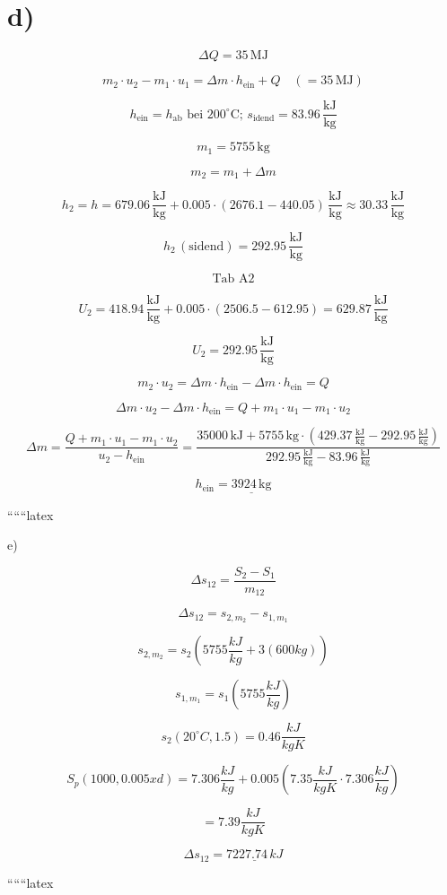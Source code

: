 \section*{d)}

\[
\Delta Q = 35 \, \text{MJ}
\]

\[
m_2 \cdot u_2 - m_1 \cdot u_1 = \Delta m \cdot h_{\text{ein}} + Q \quad \left( = 35 \, \text{MJ} \right)
\]

\[
h_{\text{ein}} = h_{\text{ab}} \text{ bei } 200^\circ \text{C}; \, s_{\text{idend}} = 83.96 \, \frac{\text{kJ}}{\text{kg}}
\]

\[
m_1 = 5755 \, \text{kg}
\]

\[
m_2 = m_1 + \Delta m
\]

\[
h_2 = h = 679.06 \, \frac{\text{kJ}}{\text{kg}} + 0.005 \cdot (2676.1 - 440.05) \, \frac{\text{kJ}}{\text{kg}} \approx 30.33 \, \frac{\text{kJ}}{\text{kg}}
\]

\[
h_2 \, (\text{sidend}) = 292.95 \, \frac{\text{kJ}}{\text{kg}}
\]

\[
\text{Tab A2}
\]

\[
U_2 = 418.94 \, \frac{\text{kJ}}{\text{kg}} + 0.005 \cdot (2506.5 - 612.95) = 629.87 \, \frac{\text{kJ}}{\text{kg}}
\]

\[
U_2 = 292.95 \, \frac{\text{kJ}}{\text{kg}}
\]

\[
m_2 \cdot u_2 = \Delta m \cdot h_{\text{ein}} - \Delta m \cdot h_{\text{ein}} = Q
\]

\[
\Delta m \cdot u_2 - \Delta m \cdot h_{\text{ein}} = Q + m_1 \cdot u_1 - m_1 \cdot u_2
\]

\[
\Delta m = \frac{Q + m_1 \cdot u_1 - m_1 \cdot u_2}{u_2 - h_{\text{ein}}} = \frac{35000 \, \text{kJ} + 5755 \, \text{kg} \cdot (429.37 \, \frac{\text{kJ}}{\text{kg}} - 292.95 \, \frac{\text{kJ}}{\text{kg}})}{292.95 \, \frac{\text{kJ}}{\text{kg}} - 83.96 \, \frac{\text{kJ}}{\text{kg}}}
\]

\[
h_{\text{ein}} = \underline{3924 \, \text{kg}}
\]

``````latex


e)

\[
\Delta s_{12} = \frac{S_2 - S_1}{m_{12}}
\]

\[
\Delta s_{12} = s_{2,m_2} - s_{1,m_1}
\]

\[
s_{2,m_2} = s_2(5755 \frac{kJ}{kg} + 3(600kg))
\]

\[
s_{1,m_1} = s_1(5755 \frac{kJ}{kg})
\]

\[
s_2(20^\circ C, 1.5) = 0.46 \frac{kJ}{kgK}
\]

\[
S_p(1000, 0.005xd) = 7.306 \frac{kJ}{kg} + 0.005(7.35 \frac{kJ}{kgK} \cdot 7.306 \frac{kJ}{kg})
\]

\[
= 7.39 \frac{kJ}{kgK}
\]

\[
\Delta s_{12} = \underline{7227.74 \, kJ}
\]

``````latex


